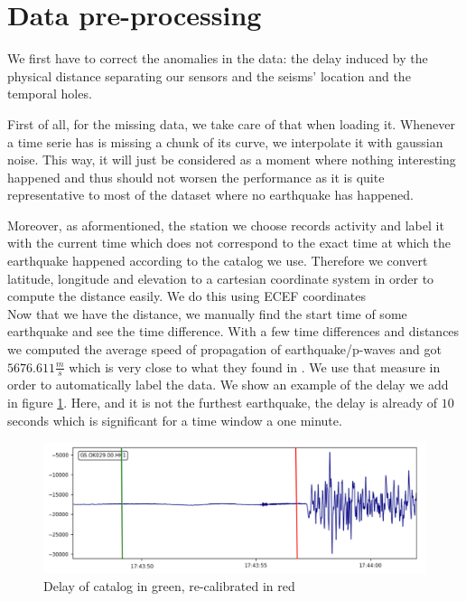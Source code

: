 \documentclass[10pt,conference,compsocconf]{IEEEtran}
\begin{document}
\section{Data pre-processing}
We first have to correct the anomalies in the data: the delay induced by the physical distance separating our sensors and the seisms' location and the temporal holes.\newline

First of all, for the missing data, we take care of that when loading it. Whenever a time serie has is missing a chunk of its curve, we interpolate it with gaussian noise. This way, it will just be considered as a moment where nothing interesting happened and thus should not worsen the performance as it is quite representative to most of the dataset where no earthquake has happened.

Moreover, as aformentioned, the station we choose records activity and label it with the current time which does not correspond to the exact time at which the earthquake happened according to the catalog we use. Therefore we convert latitude, longitude and elevation to a cartesian coordinate system in order to compute the distance easily. We do this using ECEF coordinates\cite{ECEFPaper}\\
Now that we have the distance, we manually find the start time of some earthquake and see the time difference. With a few time differences and distances we computed the average speed of propagation of earthquake/p-waves and got $5676.611\frac{m}{s}$ which is very close to what they found in \cite{PWavePaper}. We use that measure in order to automatically label the data. We show an example of the delay we add in figure \ref{fig:timediff}. Here, and it is not the furthest earthquake, the delay is already of $10$ seconds which is significant for a time window a one minute.

\begin{figure}[h]
  \centering
	\includegraphics[width=\columnwidth]{time-diff.png}
  \caption{Delay of catalog in green, re-calibrated in red}
	\label{fig:timediff}
\end{figure}
\end{document}
